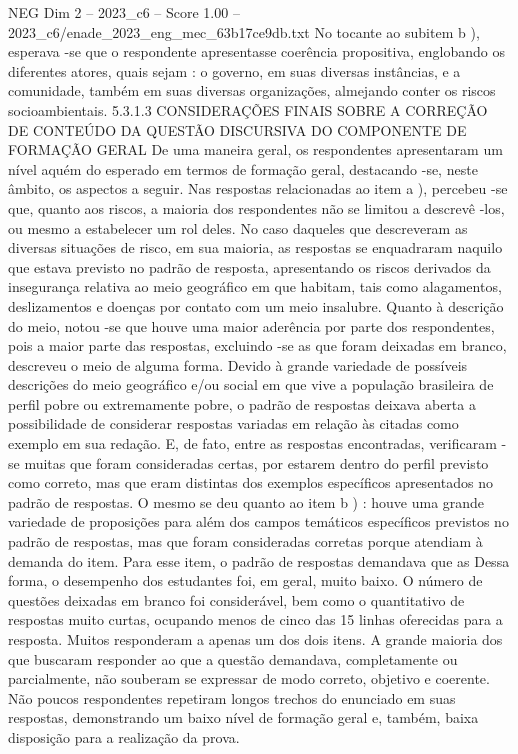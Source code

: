 \begin{textsample}{NEG Dim 2 – 2023\_c6 – Score 1.00 – 2023\_c6/enade\_2023\_eng\_mec\_63b17ce9db.txt}
No tocante ao subitem b ), esperava -se que o respondente apresentasse coerência propositiva, englobando os diferentes atores, quais sejam : o governo, em suas diversas instâncias, e a comunidade, também em suas diversas organizações, almejando conter os riscos socioambientais. 5.3.1.3 CONSIDERAÇÕES FINAIS SOBRE A CORREÇÃO DE CONTEÚDO DA QUESTÃO DISCURSIVA DO COMPONENTE DE FORMAÇÃO GERAL De uma maneira geral, os respondentes apresentaram um nível aquém do esperado em termos de formação geral, destacando -se, neste âmbito, os aspectos a seguir.
Nas respostas relacionadas ao item a ), percebeu -se que, quanto aos riscos, a maioria dos respondentes não se limitou a descrevê -los, ou mesmo a estabelecer um rol deles.
No caso daqueles que descreveram as diversas situações de risco, em sua maioria, as respostas se enquadraram naquilo que estava previsto no padrão de resposta, apresentando os riscos derivados da insegurança relativa ao meio geográfico em que habitam, tais como alagamentos, deslizamentos e doenças por contato com um meio insalubre.
Quanto à descrição do meio, notou -se que houve uma maior aderência por parte dos respondentes, pois a maior parte das respostas, excluindo -se as que foram deixadas em branco, descreveu o meio de alguma forma.
Devido à grande variedade de possíveis descrições do meio geográfico e/ou social em que vive a população brasileira de perfil pobre ou extremamente pobre, o padrão de respostas deixava aberta a possibilidade de considerar respostas variadas em relação às citadas como exemplo em sua redação.
E, de fato, entre as respostas encontradas, verificaram -se muitas que foram consideradas certas, por estarem dentro do perfil previsto como correto, mas que eram distintas dos exemplos específicos apresentados no padrão de respostas.
O mesmo se deu quanto ao item b ) : houve uma grande variedade de proposições para além dos campos temáticos específicos previstos no padrão de respostas, mas que foram consideradas corretas porque atendiam à demanda do item.
Para esse item, o padrão de respostas demandava que as Dessa forma, o desempenho dos estudantes foi, em geral, muito baixo.
O número de questões deixadas em branco foi considerável, bem como o quantitativo de respostas muito curtas, ocupando menos de cinco das 15 linhas oferecidas para a resposta.
Muitos responderam a apenas um dos dois itens.
A grande maioria dos que buscaram responder ao que a questão demandava, completamente ou parcialmente, não souberam se expressar de modo correto, objetivo e coerente.
Não poucos respondentes repetiram longos trechos do enunciado em suas respostas, demonstrando um baixo nível de formação geral e, também, baixa disposição para a realização da prova.

\end{textsample}
